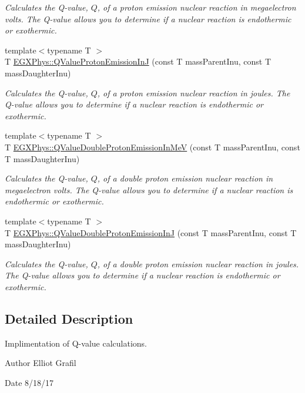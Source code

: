 \begin{DoxyCompactItemize}
\begin{DoxyCompactList}\small\item\em Calculates the Q-\/value, $Q$, of a proton emission nuclear reaction in megaelectron volts. The Q-\/value allows you to determine if a nuclear reaction is endothermic or exothermic. \end{DoxyCompactList}\item 
{\footnotesize template$<$typename T $>$ }\\T \mbox{\hyperlink{group___e_g_x_phys-_q_value-_proton_emission_ga41f19b0d9a2dc06e89de44aaa2d48d62}{E\+G\+X\+Phys\+::\+Q\+Value\+Proton\+Emission\+InJ}} (const T mass\+Parent\+Inu, const T mass\+Daughter\+Inu)
\begin{DoxyCompactList}\small\item\em Calculates the Q-\/value, $Q$, of a proton emission nuclear reaction in joules. The Q-\/value allows you to determine if a nuclear reaction is endothermic or exothermic. \end{DoxyCompactList}\item 
{\footnotesize template$<$typename T $>$ }\\T \mbox{\hyperlink{group___e_g_x_phys-_q_value-_proton_emission_ga61d07711da603f2f4426fbb3f271fc34}{E\+G\+X\+Phys\+::\+Q\+Value\+Double\+Proton\+Emission\+In\+MeV}} (const T mass\+Parent\+Inu, const T mass\+Daughter\+Inu)
\begin{DoxyCompactList}\small\item\em Calculates the Q-\/value, $Q$, of a double proton emission nuclear reaction in megaelectron volts. The Q-\/value allows you to determine if a nuclear reaction is endothermic or exothermic. \end{DoxyCompactList}\item 
{\footnotesize template$<$typename T $>$ }\\T \mbox{\hyperlink{group___e_g_x_phys-_q_value-_proton_emission_gab8979dd25aeac115834a4a8b233fec6f}{E\+G\+X\+Phys\+::\+Q\+Value\+Double\+Proton\+Emission\+InJ}} (const T mass\+Parent\+Inu, const T mass\+Daughter\+Inu)
\begin{DoxyCompactList}\small\item\em Calculates the Q-\/value, $Q$, of a double proton emission nuclear reaction in joules. The Q-\/value allows you to determine if a nuclear reaction is endothermic or exothermic. \end{DoxyCompactList}\end{DoxyCompactItemize}


\subsection{Detailed Description}
Implimentation of Q-\/value calculations. 

\begin{DoxyAuthor}{Author}
Elliot Grafil 
\end{DoxyAuthor}
\begin{DoxyDate}{Date}
8/18/17 
\end{DoxyDate}
